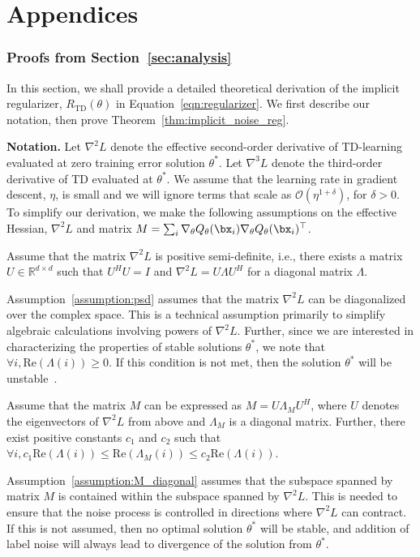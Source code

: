 \part*{Appendices}


\section{Proofs from Section~\ref{sec:analysis}}
\label{app:proofs}

In this section, we shall provide a detailed theoretical derivation of the implicit regularizer, $R_\mathrm{TD}(\theta)$ in Equation~\ref{eqn:regularizer}. We first describe our notation, then prove Theorem~\ref{thm:implicit_noise_reg}. 

\textbf{Notation.} Let $\nabla^2 L$ denote the effective second-order derivative of TD-learning evaluated at zero training error solution $\theta^*$. Let $\nabla^3 L$ denote the third-order derivative of TD evaluated at $\theta^*$. We assume that the learning rate in gradient descent, $\eta$, is small and we will ignore terms that scale as $\mathcal{O}(\eta^{1 + \delta})$, for $\delta > 0$. To simplify our derivation, we make the following assumptions on the effective Hessian, $\nabla^2 L$ and matrix $M  = \sum_i \nabla_\theta Q_\theta (\bx_i) \nabla_\theta Q_\theta (\bx_i)^\top$. 

\begin{assumption}
\label{assumption:psd}
Assume that the matrix $\nabla^2 L$ is positive semi-definite, i.e., there exists a matrix $U \in \mathbb{R}^{d \times d}$ such that $U^H U = I$ and $\nabla^2 L = U \Lambda U^H$ for a diagonal matrix $\Lambda$.  
\end{assumption}
Assumption~\ref{assumption:psd} assumes that the matrix $\nabla^2 L$ can be diagonalized over the complex space. This is a technical assumption primarily to simplify algebraic calculations involving powers of $\nabla^2 L$. Further, since we are interested in characterizing the properties of stable solutions $\theta^*$, we note that $\forall i, \mathrm{Re}(\Lambda(i)) \geq 0$. If this condition is not met, then the solution $\theta^*$ will be unstable~\citep{ghosh2020representations}.

\begin{assumption}
\label{assumption:M_diagonal}
Assume that the matrix $M$ can be expressed as $M = U \Lambda_M U^H$, where $U$ denotes the eigenvectors of $\nabla^2 L$ from above and $\Lambda_M$ is a diagonal matrix. Further, there exist positive constants $c_1$ and $c_2$ such that $\forall i, c_1 \mathrm{Re}(\Lambda(i)) \leq \mathrm{Re}(\Lambda_M(i)) \leq c_2 \mathrm{Re}(\Lambda(i))$.
\end{assumption}
Assumption~\ref{assumption:M_diagonal} assumes that the subspace spanned by matrix $M$ is contained within the subspace spanned by $\nabla^2 L$. This is needed to ensure that the noise process is controlled in directions where $\nabla^2 L$ can contract. If this is not assumed, then no optimal solution $\theta^*$ will be stable, and addition of label noise will always lead to divergence of the solution from $\theta^*$. 

